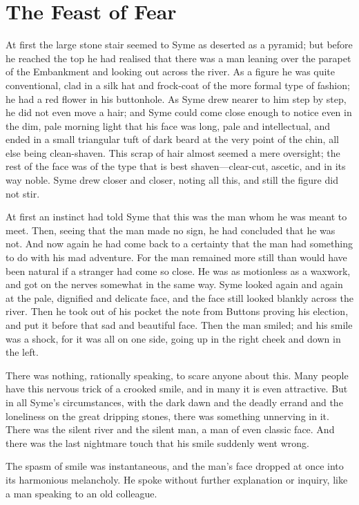 \documentclass{book}
\begin{document}
\chapter{The Feast of Fear}
\label{chapter-4}
At first the large stone stair seemed to Syme as deserted as a pyramid; but before he reached the top he had realised that there was a man leaning over the parapet of the Embankment and looking out across the river. As a figure he was quite conventional, clad in a silk hat and frock-coat of the more formal type of fashion; he had a red flower in his buttonhole. As Syme drew nearer to him step by step, he did not even move a hair; and Syme could come close enough to notice even in the dim, pale morning light that his face was long, pale and intellectual, and ended in a small triangular tuft of dark beard at the very point of the chin, all else being clean-shaven. This scrap of hair almost seemed a mere oversight; the rest of the face was of the type that is best shaven—clear-cut, ascetic, and in its way noble. Syme drew closer and closer, noting all this, and still the figure did not stir.

At first an instinct had told Syme that this was the man whom he was meant to meet. Then, seeing that the man made no sign, he had concluded that he was not. And now again he had come back to a certainty that the man had something to do with his mad adventure. For the man remained more still than would have been natural if a stranger had come so close. He was as motionless as a waxwork, and got on the nerves somewhat in the same way. Syme looked again and again at the pale, dignified and delicate face, and the face still looked blankly across the river. Then he took out of his pocket the note from Buttons proving his election, and put it before that sad and beautiful face. Then the man smiled; and his smile was a shock, for it was all on one side, going up in the right cheek and down in the left.

There was nothing, rationally speaking, to scare anyone about this. Many people have this nervous trick of a crooked smile, and in many it is even attractive. But in all Syme’s circumstances, with the dark dawn and the deadly errand and the loneliness on the great dripping stones, there was something unnerving in it. There was the silent river and the silent man, a man of even classic face. And there was the last nightmare touch that his smile suddenly went wrong.

The spasm of smile was instantaneous, and the man’s face dropped at once into its harmonious melancholy. He spoke without further explanation or inquiry, like a man speaking to an old colleague.
\end{document}
